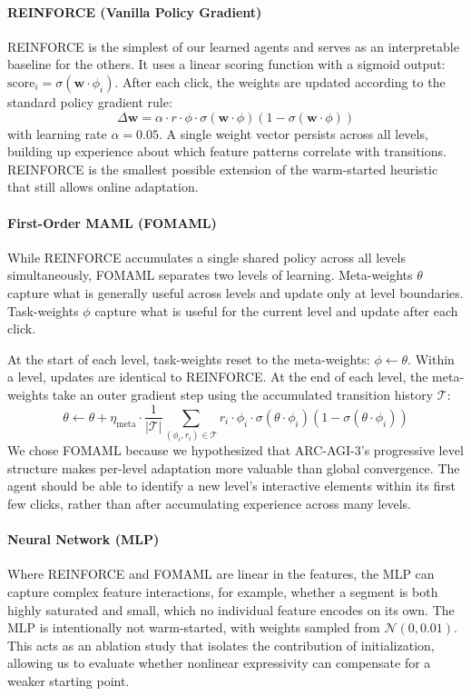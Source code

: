 \documentclass{article}
\begin{document}
\paragraph{REINFORCE (Vanilla Policy Gradient)} 
REINFORCE is the simplest of our learned agents and serves as an interpretable baseline for the others. It uses a linear scoring function with a sigmoid output: $\text{score}_i = \sigma(\mathbf{w} \cdot \phi_i)$. After each click, the weights are updated according to the standard policy gradient rule:
\begin{equation}
\Delta\mathbf{w} = \alpha \cdot r \cdot \phi \cdot \sigma(\mathbf{w} \cdot \phi)(1 - \sigma(\mathbf{w} \cdot \phi))
\end{equation}
with learning rate $\alpha = 0.05$. A single weight vector persists across all levels, building up experience about which feature patterns correlate with transitions. REINFORCE is the smallest possible extension of the warm-started heuristic that still allows online adaptation.

\paragraph{First-Order MAML (FOMAML)} 
While REINFORCE accumulates a single shared policy across all levels simultaneously, FOMAML separates two levels of learning. Meta-weights $\theta$ capture what is generally useful across levels and update only at level boundaries. Task-weights $\phi$ capture what is useful for the current level and update after each click. 

At the start of each level, task-weights reset to the meta-weights: $\phi \leftarrow \theta$. Within a level, updates are identical to REINFORCE. At the end of each level, the meta-weights take an outer gradient step using the accumulated transition history $\mathcal{T}$:
\begin{equation}
\theta \leftarrow \theta + \eta_{\text{meta}} \cdot \frac{1}{|\mathcal{T}|} \sum_{(\phi_i, r_i) \in \mathcal{T}} r_i \cdot \phi_i \cdot \sigma(\theta \cdot \phi_i)(1 - \sigma(\theta \cdot \phi_i))
\end{equation}
We chose FOMAML because we hypothesized that ARC-AGI-3's progressive level structure makes per-level adaptation more valuable than global convergence. The agent should be able to identify a new level's interactive elements within its first few clicks, rather than after accumulating experience across many levels.

\paragraph{Neural Network (MLP)} 
Where REINFORCE and FOMAML are linear in the features, the MLP can capture complex feature interactions, for example, whether a segment is both highly saturated and small, which no individual feature encodes on its own. The MLP is intentionally not warm-started, with weights sampled from $\mathcal{N}(0, 0.01)$. This acts as an ablation study that isolates the contribution of initialization, allowing us to evaluate whether nonlinear expressivity can compensate for a weaker starting point.
\end{document}

